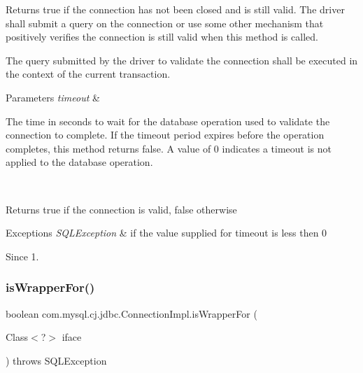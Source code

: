 Returns true if the connection has not been closed and is still valid. The driver shall submit a query on the connection or use some other mechanism that positively verifies the connection is still valid when this method is called. 

The query submitted by the driver to validate the connection shall be executed in the context of the current transaction.


\begin{DoxyParams}{Parameters}
{\em timeout} & 
\begin{DoxyItemize}
\item The time in seconds to wait for the database operation used to validate the connection to complete. If the timeout period expires before the operation completes, this method returns false. A value of 0 indicates a timeout is not applied to the database operation. 
\end{DoxyItemize}\\
\hline
\end{DoxyParams}
\begin{DoxyReturn}{Returns}
true if the connection is valid, false otherwise 
\end{DoxyReturn}

\begin{DoxyExceptions}{Exceptions}
{\em S\+Q\+L\+Exception} & if the value supplied for {\ttfamily timeout} is less then 0 \\
\hline
\end{DoxyExceptions}
\begin{DoxySince}{Since}
1. 
\end{DoxySince}
\mbox{\label{classcom_1_1mysql_1_1cj_1_1jdbc_1_1_connection_impl_a81fc1065c0ebf1f56f7c8d1f60d4333f}} 
\subsubsection{\texorpdfstring{is\+Wrapper\+For()}{isWrapperFor()}}
{\footnotesize\ttfamily boolean com.\+mysql.\+cj.\+jdbc.\+Connection\+Impl.\+is\+Wrapper\+For (\begin{DoxyParamCaption}\item[{Class$<$?$>$}]{iface }\end{DoxyParamCaption}) throws S\+Q\+L\+Exception}

